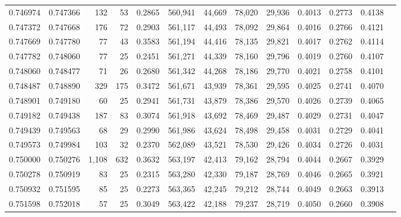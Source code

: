 \begin{tabular}{rrrrrrrrrrrrr}
0.746974 & 0.747366 &   132 &  53 &                                     0.2865 & 560,941 &  44,669 &  78,020 &  29,936 & 0.4013 & 0.2773 & 0.4138 \\
0.747372 & 0.747668 &   176 &  72 &                                     0.2903 & 561,117 &  44,493 &  78,092 &  29,864 & 0.4016 & 0.2766 & 0.4121 \\
0.747669 & 0.747780 &    77 &  43 &                                     0.3583 & 561,194 &  44,416 &  78,135 &  29,821 & 0.4017 & 0.2762 & 0.4114 \\
0.747782 & 0.748060 &    77 &  25 &                                     0.2451 & 561,271 &  44,339 &  78,160 &  29,796 & 0.4019 & 0.2760 & 0.4107 \\
0.748060 & 0.748477 &    71 &  26 &                                     0.2680 & 561,342 &  44,268 &  78,186 &  29,770 & 0.4021 & 0.2758 & 0.4101 \\
0.748487 & 0.748890 &   329 & 175 &                                     0.3472 & 561,671 &  43,939 &  78,361 &  29,595 & 0.4025 & 0.2741 & 0.4070 \\
0.748901 & 0.749180 &    60 &  25 &                                     0.2941 & 561,731 &  43,879 &  78,386 &  29,570 & 0.4026 & 0.2739 & 0.4065 \\
0.749182 & 0.749438 &   187 &  83 &                                     0.3074 & 561,918 &  43,692 &  78,469 &  29,487 & 0.4029 & 0.2731 & 0.4047 \\
0.749439 & 0.749563 &    68 &  29 &                                     0.2990 & 561,986 &  43,624 &  78,498 &  29,458 & 0.4031 & 0.2729 & 0.4041 \\
0.749573 & 0.749984 &   103 &  32 &                                     0.2370 & 562,089 &  43,521 &  78,530 &  29,426 & 0.4034 & 0.2726 & 0.4031 \\
0.750000 & 0.750276 & 1,108 & 632 &                                     0.3632 & 563,197 &  42,413 &  79,162 &  28,794 & 0.4044 & 0.2667 & 0.3929 \\
0.750278 & 0.750919 &    83 &  25 &                                     0.2315 & 563,280 &  42,330 &  79,187 &  28,769 & 0.4046 & 0.2665 & 0.3921 \\
0.750932 & 0.751595 &    85 &  25 &                                     0.2273 & 563,365 &  42,245 &  79,212 &  28,744 & 0.4049 & 0.2663 & 0.3913 \\
0.751598 & 0.752018 &    57 &  25 &                                     0.3049 & 563,422 &  42,188 &  79,237 &  28,719 & 0.4050 & 0.2660 & 0.3908 \\

\end{tabular}
